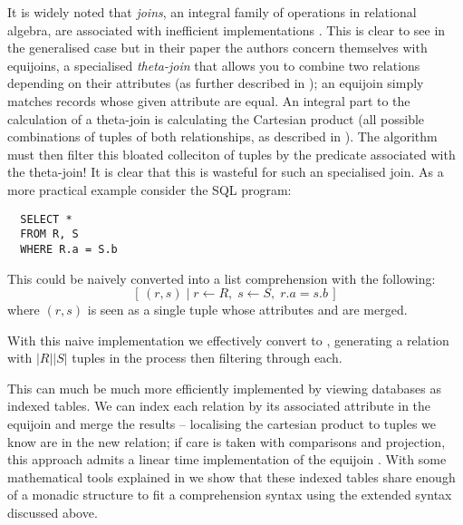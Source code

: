 It is widely noted that \emph{joins}, an integral family of operations in relational algebra, are associated with inefficient implementations \cite{JoinProcessing}. This is clear to see in the generalised case but in their paper \cite{RelationalAlgebraByWayOfAdjunctions} the authors concern themselves with equijoins, a specialised \emph{theta-join} that allows you to combine two relations depending on their attributes (as further described in ); an equijoin simply matches records whose given attribute are equal. An integral part to the calculation of a theta-join is calculating the Cartesian product (all possible combinations of tuples of both relationships, as described in ). The algorithm must then filter this bloated colleciton of tuples by the predicate associated with the theta-join! It is clear that this is wasteful for such an specialised join. As a more practical example consider the SQL program:
\begin{lstlisting}
  SELECT *
  FROM R, S
  WHERE R.a = S.b
\end{lstlisting}
This could be naively converted into a list comprehension with the following:
\[
  \left[\,(r, s)\;|\;r \leftarrow R,\;s \leftarrow S,\;r.a = s.b\,\right]
\]
where $(r, s)$ is seen as a single tuple whose attributes  and  are merged. 

With this naive implementation we effectively convert  to , generating a relation with $|R||S|$ tuples in the process then filtering through each.

This can much be much more efficiently implemented by viewing databases as indexed tables. We can index each relation by its associated attribute in the equijoin and merge the results -- localising the cartesian product to tuples we know are in the new relation; if care is taken with comparisons and projection, this approach admits a linear time implementation of the equijoin \cite{RelationalAlgebraByWayOfAdjunctions}. With some mathematical tools explained in  we show that these indexed tables share enough of a monadic structure to fit a comprehension syntax using the extended syntax discussed above.

